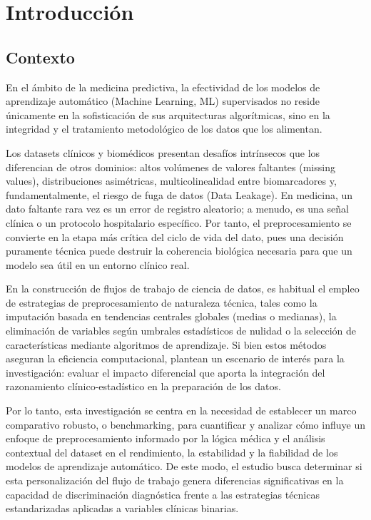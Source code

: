 \section{Introducción}\label{sec:intro}

\subsection{Contexto}

En el ámbito de la medicina predictiva, la efectividad de los modelos de aprendizaje automático (Machine Learning, ML) supervisados no reside únicamente en la sofisticación de sus arquitecturas algorítmicas, sino en la integridad y el tratamiento metodológico de los datos que los alimentan.

Los datasets clínicos y biomédicos presentan desafíos intrínsecos que los
diferencian de otros dominios: altos volúmenes de valores faltantes (missing
values), distribuciones asimétricas, multicolinealidad entre biomarcadores y,
fundamentalmente, el riesgo de fuga de datos (Data Leakage). En medicina, un
dato faltante rara vez es un error de registro aleatorio; a menudo, es una señal
clínica o un protocolo hospitalario específico.
Por tanto, el preprocesamiento se convierte en la etapa más
crítica del ciclo de vida del dato, pues una decisión puramente técnica puede
destruir la coherencia biológica necesaria para que un modelo sea útil en un
entorno clínico real.

En la construcción de flujos de trabajo de ciencia de datos, es habitual el empleo de estrategias de preprocesamiento de naturaleza técnica, tales como la imputación basada en tendencias centrales globales (medias o medianas), la eliminación de variables según umbrales estadísticos de nulidad o la selección de características mediante algoritmos de aprendizaje. Si bien estos métodos aseguran la eficiencia computacional, plantean un escenario de interés para la investigación: evaluar el impacto diferencial que aporta la integración del razonamiento clínico-estadístico en la preparación de los datos.

Por lo tanto, esta investigación se centra en la necesidad de establecer un marco comparativo robusto, o benchmarking, para cuantificar y analizar cómo influye un enfoque de preprocesamiento informado por la lógica médica y el análisis contextual del dataset en el rendimiento, la estabilidad y la fiabilidad de los modelos de aprendizaje automático. De este modo, el estudio busca determinar si esta personalización del flujo de trabajo genera diferencias significativas en la capacidad de discriminación diagnóstica frente a las estrategias técnicas estandarizadas aplicadas a variables clínicas binarias.

